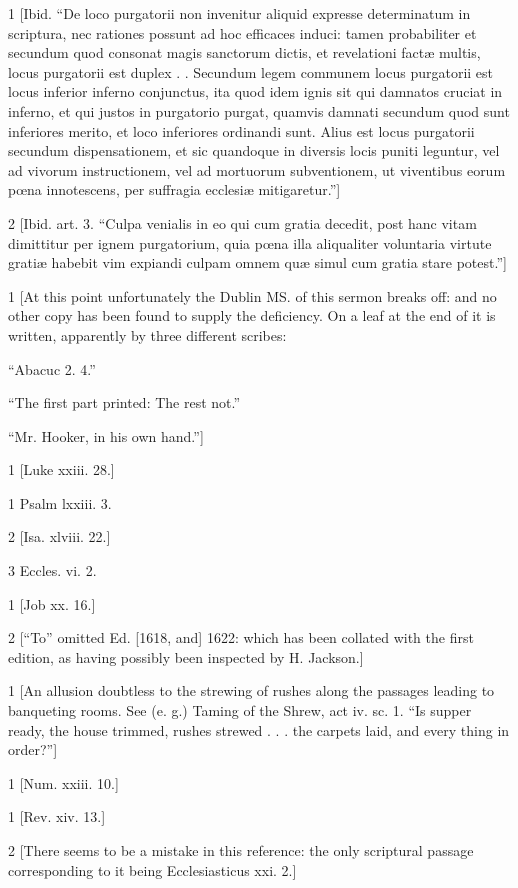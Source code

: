 1
[Ibid. “De loco purgatorii non invenitur aliquid expresse determinatum in scriptura, nec rationes possunt ad hoc efficaces induci: tamen probabiliter et secundum quod consonat magis sanctorum dictis, et revelationi factæ multis, locus purgatorii est duplex . . Secundum legem communem locus purgatorii est locus inferior inferno conjunctus, ita quod idem ignis sit qui damnatos cruciat in inferno, et qui justos in purgatorio purgat, quamvis damnati secundum quod sunt inferiores merito, et loco inferiores ordinandi sunt. Alius est locus purgatorii secundum dispensationem, et sic quandoque in diversis locis puniti leguntur, vel ad vivorum instructionem, vel ad mortuorum subventionem, ut viventibus eorum pœna innotescens, per suffragia ecclesiæ mitigaretur.”]

2
[Ibid. art. 3. “Culpa venialis in eo qui cum gratia decedit, post hanc vitam dimittitur per ignem purgatorium, quia pœna illa aliqualiter voluntaria virtute gratiæ habebit vim expiandi culpam omnem quæ simul cum gratia stare potest.”]

1
[At this point unfortunately the Dublin MS. of this sermon breaks off: and no other copy has been found to supply the deficiency. On a leaf at the end of it is written, apparently by three different scribes:

“Abacuc 2. 4.”

“The first part printed: The rest not.”

“Mr. Hooker, in his own hand.”]

1
[Luke xxiii. 28.]

1
Psalm lxxiii. 3.

2
[Isa. xlviii. 22.]

3
Eccles. vi. 2.

1
[Job xx. 16.]

2
[“To” omitted Ed. [1618, and] 1622: which has been collated with the first edition, as having possibly been inspected by H. Jackson.]

1
[An allusion doubtless to the strewing of rushes along the passages leading to banqueting rooms. See (e. g.) Taming of the Shrew, act iv. sc. 1. “Is supper ready, the house trimmed, rushes strewed . . . the carpets laid, and every thing in order?”]

1
[Num. xxiii. 10.]

1
[Rev. xiv. 13.]

2
[There seems to be a mistake in this reference: the only scriptural passage corresponding to it being Ecclesiasticus xxi. 2.]

